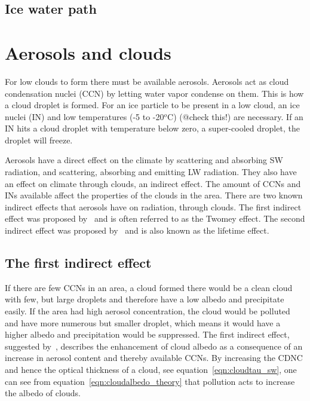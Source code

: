 \subsection{Ice water path}

\section{Aerosols and clouds}%
For low clouds to form there must be available aerosols. Aerosols act as cloud condensation nuclei (CCN) by letting water vapor condense on them. This is how a cloud droplet is formed. For an ice particle to be present in a low cloud, an ice nuclei (IN) and low temperatures (-5 to -20$^o$C) (@check this!)
are necessary. If an IN hits a cloud droplet with temperature below zero, a super-cooled droplet, the droplet will freeze.

Aerosols have a direct effect on the climate by scattering and absorbing SW radiation, and scattering, absorbing and emitting LW radiation.%
They also have an effect on climate through clouds, an indirect effect. The amount of CCNs and INs available affect the properties of the clouds in the area. There are two known indirect effects that aerosols have on radiation, through clouds. The first indirect effect was proposed by~\citet{Twomey1974} and is often referred to as the Twomey effect. The second indirect effect was proposed by~\citet{Albrecht1989} and is also known as the lifetime effect.

\subsection{The first indirect effect}%
If there are few CCNs in an area, a cloud formed there would be a clean cloud with few, but large droplets and therefore have a low albedo and precipitate easily. If the area had high aerosol concentration, the cloud would be polluted and have more numerous but smaller droplet, which means it would have a higher albedo and precipitation would be suppressed. 
The first indirect effect, suggested by~\citet{Twomey1974}, describes the enhancement of cloud albedo as a consequence of an increase in aerosol content and thereby available CCNs.
By increasing the CDNC and hence the optical thickness of a cloud, see equation~\ref{eqn:cloudtau_sw}, one can see from equation~\ref{eqn:cloudalbedo_theory} that pollution acts to increase the albedo of clouds.


